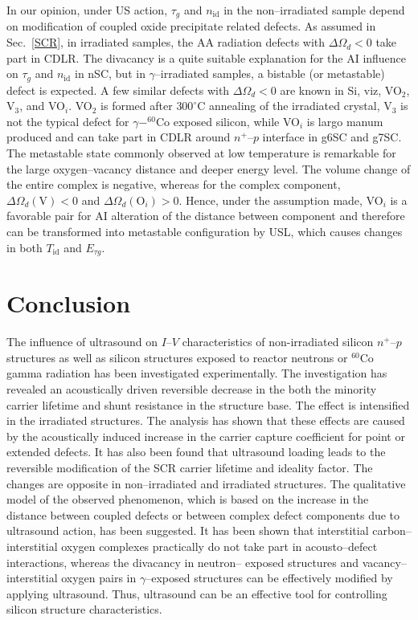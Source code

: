 \documentclass[aip,jap, amsmath,amssymb,reprint]{revtex4-1}
\begin{document}
In our opinion, under US action, $\tau_g$ and $n_\mathrm{id}$ in the non--irradiated sample
depend on modification of coupled oxide precipitate related defects.
As assumed in Sec.~\ref{SCR}, in irradiated samples,
the AA radiation defects with $\Delta\Omega_d<0$ take part in CDLR.
The divacancy is a quite suitable explanation for the AI influence on $\tau_g$ and $n_\mathrm{id}$ in nSC, but in $\gamma$--irradiated samples, a bistable (or metastable) defect is expected.
A few similar defects with $\Delta\Omega_d<0$ are known in Si,
viz, VO$_2$,\cite{V2Obistable}
V$_3$,\cite{V3:Markevich}
and VO$_i$.\cite{Bistable:UFN}
VO$_2$ is formed after $300^\circ$C annealing of the irradiated crystal,
V$_3$ is not the typical defect for $\gamma-^{60}$Co exposed silicon,
while VO$_i$ is largo manum produced and can take part in CDLR around $n^+$--$p$
interface in g6SC and g7SC.
The metastable state commonly observed at low temperature is remarkable for the
large oxygen--vacancy distance and deeper energy level.\cite{Bistable:UFN}
The volume change of the entire complex is negative,
whereas for the complex component, $\Delta\Omega_d(\mbox{V})<0$ and
$\Delta\Omega_d(\mbox{O}_i)>0$.
Hence, under the assumption made, VO$_i$ is a favorable pair for AI alteration of the distance between component and therefore can be transformed into metastable configuration by USL, which
causes changes in both $T_{\mathrm{id}}$ and $E_{\tau g}$.



\section{Conclusion}
The influence of ultrasound on $I$--$V$ characteristics of non-irradiated silicon $n^+$--$p$ structures as well as silicon structures exposed to reactor neutrons or $^{60}$Co gamma radiation has been investigated experimentally.
The investigation has revealed an acoustically driven reversible decrease in the both the minority carrier lifetime and shunt resistance in the structure base.
The effect is intensified in the irradiated structures.
The analysis has shown that these effects are caused by the acoustically induced increase in the carrier capture coefficient for point or extended defects.
It has also been found that ultrasound loading leads to the reversible modification of the SCR carrier lifetime and ideality factor.
The changes are opposite in non--irradiated and irradiated structures.
The qualitative model of the observed phenomenon, which is based on the increase in the distance between coupled defects or between complex defect components due to ultrasound action, has been suggested.
It has been shown that interstitial carbon--interstitial oxygen complexes practically do not take part in acousto--defect interactions, whereas the divacancy in neutron-- exposed structures and vacancy--interstitial oxygen pairs in $\gamma$--exposed structures can be effectively modified by applying ultrasound.
Thus, ultrasound can be an effective tool for controlling silicon structure characteristics.



\end{document}
